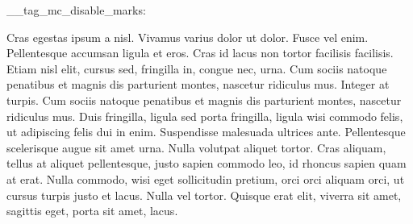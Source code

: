 \documentclass{book}
\begin{document}
\csname __tag_mc_disable_marks:\endcsname

Cras egestas ipsum a nisl. Vivamus varius dolor
ut dolor. Fusce vel enim. Pellentesque accumsan ligula et eros. Cras
id lacus non tortor facilisis facilisis. Etiam nisl elit, cursus
sed, fringilla in, congue nec, urna. Cum sociis natoque penatibus et
magnis dis parturient montes, nascetur ridiculus mus. Integer at
turpis. Cum sociis natoque penatibus et magnis dis parturient
montes, nascetur ridiculus mus. Duis fringilla, ligula sed porta
fringilla, ligula wisi commodo felis, ut adipiscing felis dui in
enim. Suspendisse malesuada ultrices ante.%
Pellentesque scelerisque
augue sit amet urna. Nulla volutpat aliquet tortor. Cras aliquam,
tellus at aliquet pellentesque, justo sapien commodo leo, id rhoncus
sapien quam at erat. Nulla commodo, wisi eget sollicitudin pretium,
orci orci aliquam orci, ut cursus turpis justo et lacus. Nulla vel
tortor. Quisque erat elit, viverra sit amet, sagittis eget, porta
sit amet, lacus.\tagmcend
\end{document}
